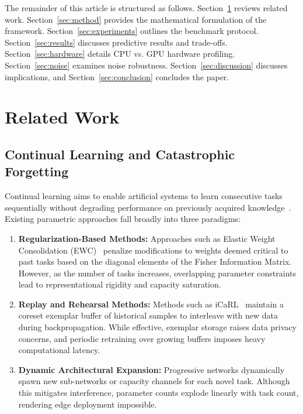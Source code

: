 \documentclass[sn-mathphys,Numbered]{sn-jnl}
\begin{document}
The remainder of this article is structured as follows. Section~\ref{sec:related} reviews related work. Section~\ref{sec:method} provides the mathematical formulation of the framework. Section~\ref{sec:experiments} outlines the benchmark protocol. Section~\ref{sec:results} discusses predictive results and trade-offs. Section~\ref{sec:hardware} details CPU vs. GPU hardware profiling. Section~\ref{sec:noise} examines noise robustness. Section~\ref{sec:discussion} discusses implications, and Section~\ref{sec:conclusion} concludes the paper.


\section{Related Work}\label{sec:related}

\subsection{Continual Learning and Catastrophic Forgetting}
Continual learning aims to enable artificial systems to learn consecutive tasks sequentially without degrading performance on previously acquired knowledge~\cite{parisi2019continual}. Existing parametric approaches fall broadly into three paradigms:
\begin{enumerate}
    \item \textbf{Regularization-Based Methods:} Approaches such as Elastic Weight Consolidation (EWC)~\cite{kirkpatrick2017overcoming} penalize modifications to weights deemed critical to past tasks based on the diagonal elements of the Fisher Information Matrix. However, as the number of tasks increases, overlapping parameter constraints lead to representational rigidity and capacity saturation.
    \item \textbf{Replay and Rehearsal Methods:} Methods such as iCaRL~\cite{rebuffi2017icarl} maintain a coreset exemplar buffer of historical samples to interleave with new data during backpropagation. While effective, exemplar storage raises data privacy concerns, and periodic retraining over growing buffers imposes heavy computational latency.
    \item \textbf{Dynamic Architectural Expansion:} Progressive networks dynamically spawn new sub-networks or capacity channels for each novel task. Although this mitigates interference, parameter counts explode linearly with task count, rendering edge deployment impossible.
\end{enumerate}
\end{document}
